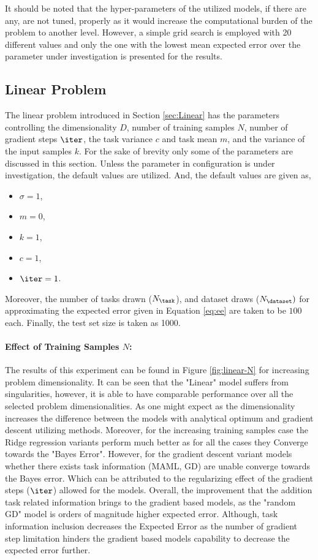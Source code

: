 It should be noted that the hyper-parameters of the utilized models, if there are any, are not tuned, properly as it would increase the computational burden of the problem to another level. However, a simple grid search is employed with 20 different values and only the one with the lowest mean expected error over the parameter under investigation is presented for the results. 

\subsection{Linear Problem}
The linear problem introduced in Section \ref{sec:Linear} has the parameters controlling the dimensionality $D$, number of training samples $N$, number of gradient steps $\iter$, the task variance $c$ and task mean $m$, and the variance of the input samples $k$. For the sake of brevity only some of the parameters are discussed in this section. Unless the parameter in configuration is under investigation, the default values are utilized. And, the default values are given as,
\begin{itemize}
  \item $\sigma=1$,
  \item $m=0$,
  \item $k=1$,
  \item $c=1$,
  \item $\iter=1$.
\end{itemize}
Moreover, the number of tasks drawn ($N_{\task}$), and dataset draws ($N_{\dataset})$  for approximating the expected error given in Equation \ref{eq:ee} are taken to be $100$ each. Finally, the test set size is taken as 1000.

\paragraph{Effect of Training Samples $N$:} The results of this experiment can be found in Figure \ref{fig:linear-N} for increasing problem dimensionality. It can be seen that the "Linear" model suffers from singularities, however, it is able to have comparable performance over all the selected problem dimensionalities. As one might expect as the dimensionality increases the difference between the models with analytical optimum and gradient descent utilizing methods. Moreover, for the increasing training samples case the Ridge regression variants perform much better as for all the cases they Converge towards the "Bayes Error". However, for the gradient descent variant models whether there exists task information (\eg MAML, GD) are unable converge towards the Bayes error. Which can be attributed to the regularizing effect of the gradient steps ($\iter$) allowed for the models. Overall, the improvement that the addition task related information brings to the gradient based models, as the "random GD" model is orders of magnitude higher expected error. Although, task information inclusion decreases the Expected Error as the number of gradient step limitation hinders the gradient based models capability to decrease the expected error further.

